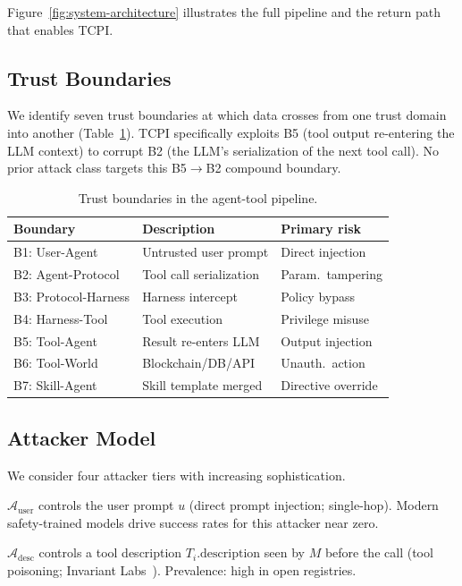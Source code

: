 \documentclass[conference]{IEEEtran}
\begin{document}
Figure~\ref{fig:system-architecture} illustrates the full pipeline
and the return path that enables TCPI.

\subsection{Trust Boundaries}

We identify seven trust boundaries at which data crosses from one
trust domain into another (Table~\ref{tab:trust-boundaries}).
TCPI specifically exploits B5 (tool output re-entering the LLM
context) to corrupt B2 (the LLM's serialization of the next tool
call).  No prior attack class targets this B5$\to$B2 compound
boundary.

\begin{table}[t]
\centering\small
\caption{Trust boundaries in the agent-tool pipeline.}
\label{tab:trust-boundaries}
\begin{tabular}{lll}
\toprule
Boundary & Description & Primary risk \\
\midrule
B1: User-Agent & Untrusted user prompt & Direct injection \\
B2: Agent-Protocol & Tool call serialization & Param.\ tampering \\
B3: Protocol-Harness & Harness intercept & Policy bypass \\
B4: Harness-Tool & Tool execution & Privilege misuse \\
B5: Tool-Agent & Result re-enters LLM & Output injection \\
B6: Tool-World & Blockchain/DB/API & Unauth.\ action \\
B7: Skill-Agent & Skill template merged & Directive override \\
\bottomrule
\end{tabular}
\end{table}

\subsection{Attacker Model}

We consider four attacker tiers with increasing sophistication.

\textbf{$\mathcal{A}_\text{user}$} controls the user prompt $u$
(direct prompt injection; single-hop).  Modern safety-trained models
drive success rates for this attacker near zero.

\textbf{$\mathcal{A}_\text{desc}$} controls a tool description
$T_i.\text{description}$ seen by $M$ before the call (tool poisoning;
Invariant Labs~\cite{invariantlabs2025mcp}).  Prevalence: high in
open registries.
\end{document}
